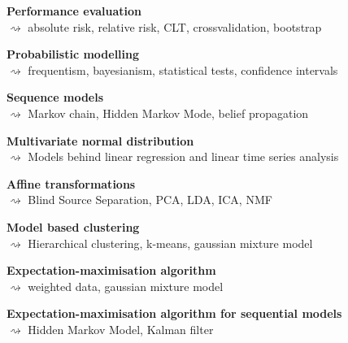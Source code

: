 \documentclass[landscape,footrule]{foils}
\begin{document}
\enlargethispage{1cm}
\begin{small}
\begin{triangles}
\item \textbf{Performance evaluation}\\ $\rightsquigarrow$ absolute risk, relative risk, CLT, crossvalidation, bootstrap 
\item \textbf{Probabilistic modelling}\\ $\rightsquigarrow$ 
frequentism, bayesianism, statistical tests, confidence intervals 
\item \textbf{Sequence models}\\ $\rightsquigarrow$ 
Markov chain, Hidden Markov Mode, belief propagation 
\item \textbf{Multivariate normal distribution}\\ $\rightsquigarrow$
Models behind linear regression and linear time series analysis   
\item \textbf{Affine transformations}\\ $\rightsquigarrow$
Blind Source Separation, PCA, LDA, ICA, NMF   
\item \textbf{Model based clustering}\\ $\rightsquigarrow$
Hierarchical clustering, k-means, gaussian mixture model  
\item \textbf{Expectation-maximisation algorithm}\\ $\rightsquigarrow$
weighted data, gaussian mixture model
\item \textbf{Expectation-maximisation algorithm for sequential models}\\ $\rightsquigarrow$
Hidden Markov Model, Kalman filter
\end{triangles}
\end{small}
\end{document}
